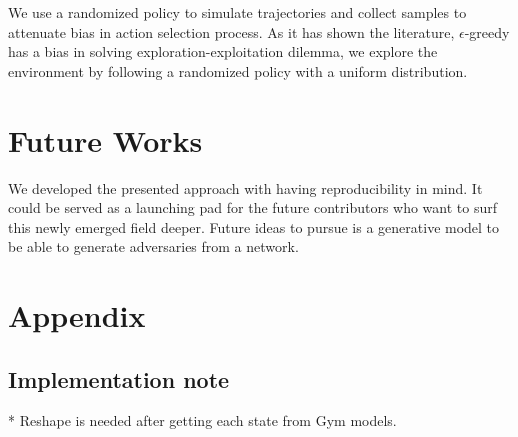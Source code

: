 \documentclass{article}
\begin{document}
    We use a randomized policy to simulate trajectories and collect samples to attenuate bias in action selection
    process.
    As it has shown the literature, $\epsilon$-greedy has a bias in solving exploration-exploitation dilemma, we
    explore the environment by following a randomized policy with a uniform distribution.

    \section{Future Works}
    We developed the presented approach with having reproducibility in mind. It could be served as a launching pad for the future contributors who want to surf this newly emerged field deeper. Future ideas to pursue is a generative model to be able to generate adversaries from a network.

    \section*{Appendix}

    \subsection{Implementation note}
    * Reshape is needed after getting each state from Gym models.


    
    




\end{document}
